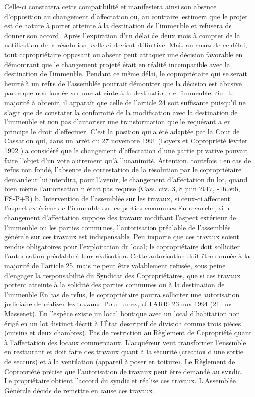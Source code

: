 			Celle-ci constatera cette compatibilité et manifestera ainsi son absence d'opposition au changement d'affectation ou, au contraire, estimera que le projet est de nature à porter atteinte à la destination de l'immeuble et refusera de donner son accord. Après l'expiration d'un délai de deux mois à compter de la notification de la résolution, celle-ci devient définitive.
			Mais au cours de ce délai, tout copropriétaire opposant ou absent peut attaquer une décision favorable en démontrant que le changement projeté était en réalité incompatible avec la destination de l'immeuble. Pendant ce même délai, le copropriétaire qui se serait heurté à un refus de l'assemblée pourrait démontrer que la décision est abusive parce que non fondée sur une atteinte à la destination de l'immeuble.
			Sur la majorité à obtenir, il apparaît que celle de l'article 24 soit suffisante puisqu'il ne s'agit que de constater la conformité de la modification avec la destination de l'immeuble et non pas d'autoriser une transformation que le requérant a en principe le droit d'effectuer. C'est la position qui a été adoptée par la Cour de Cassation qui, dans un arrêt du 27 novembre 1991 (Loyers et Copropriété février 1992 ) a considéré que le changement d'affectation d'une partie privative pouvait faire l'objet d'un vote autrement qu'à l'unanimité.
			Attention, toutefois : en cas de refus non fondé, l’absence de contestation de la résolution par le copropriétaire demandeur lui interdira, pour l’avenir, le changement d’affectation du lot, quand bien même l’autorisation n’était pas requise (Cass. civ. 3, 8 juin 2017, -16.566, FS-P+B)
			b. Intervention de l’assemblée sur les travaux, si ceux-ci affectent l’aspect extérieur de l’immeuble ou les parties communes
			En revanche, si le changement d’affectation suppose des travaux modifiant l’aspect extérieur de l’immeuble ou les parties communes, l’autorisation préalable de l’assemblée générale sur ces travaux est indispensable. Peu importe que ces travaux soient rendus obligatoires pour l'exploitation du local; le copropriétaire doit solliciter l'autorisation préalable à leur réalisation.
			Cette autorisation doit être donnée à la majorité de l’article 25, mais ne peut être valablement refusée, sous peine d’engager la responsabilité du Syndicat des Copropriétaires, que si ces travaux portent atteinte à la solidité des parties communes ou à la destination de l’immeuble
			En cas de refus, le copropriétaire pourra solliciter une autorisation judiciaire de réaliser les travaux.
			Pour un ex, cf PARIS 23 nov 1994 (21 rue Massenet).
			En l'espèce existe un local boutique avec un local d'habitation non érigé en un lot distinct décrit à l'État descriptif de division comme trois pièces (cuisine et deux chambres). Pas de restriction au Règlement de Copropriété quant à l'affectation des locaux commerciaux. L'acquéreur veut transformer l'ensemble en restaurant et doit faire des travaux quant à la sécurité (création d'une sortie de secours) et à la ventilation (appareil à poser en toiture). Le Règlement de Copropriété précise que l'autorisation de travaux peut être demandé au syndic. Le propriétaire obtient l'accord du syndic et réalise ces travaux. L’Assemblée Générale décide de remettre en cause ces travaux.

